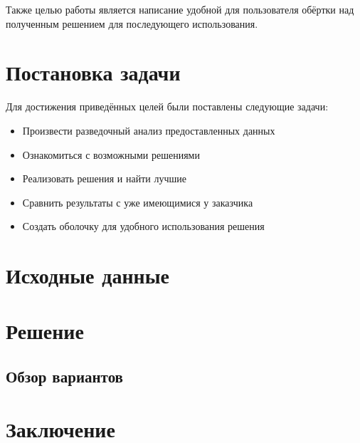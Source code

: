 \documentclass[14pt]{matmex-diploma}
\begin{document}
    Также целью работы является написание удобной для пользователя обёртки над полученным решением для последующего использования.


\section{Постановка задачи}

    Для достижения приведённых целей были поставлены следующие задачи:
    
    \begin{itemize}
        \item Произвести разведочный анализ предоставленных данных
        \item Ознакомиться с возможными решениями
        \item Реализовать решения и найти лучшие
        \item Сравнить результаты с уже имеющимися у заказчика
        \item Создать оболочку для удобного использования решения
    \end{itemize}    
    

\section{Исходные данные}

    


\section{Решение}

    \subsection{Обзор вариантов}
    



\section*{Заключение}


\setmonofont[Mapping=tex-text]{CMU Typewriter Text}


\end{document}
